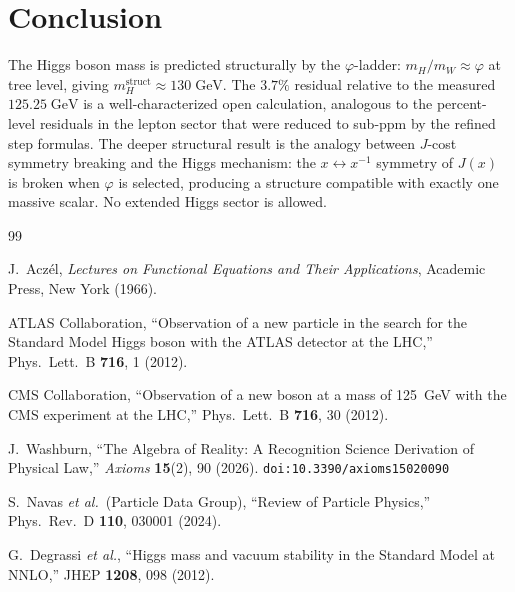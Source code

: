 \documentclass[12pt,a4paper]{article}
\theoremstyle{definition}
\theoremstyle{remark}
\begin{document}
\section{Conclusion}
\label{sec:conclusion}

The Higgs boson mass is predicted structurally by the
$\varphi$-ladder: $m_H / m_W \approx \varphi$ at tree level,
giving $m_H^{\mathrm{struct}} \approx 130\;\mathrm{GeV}$.
The $3.7\%$ residual relative to the measured
$125.25\;\mathrm{GeV}$ is a well-characterized open
calculation, analogous to the percent-level residuals in the
lepton sector that were reduced to sub-ppm by the refined
step formulas.  The deeper structural result is the analogy between
$J$-cost symmetry breaking and the Higgs mechanism: the
$x \leftrightarrow x^{-1}$ symmetry of $J(x)$ is broken
when $\varphi$ is selected, producing a structure compatible with
exactly one massive scalar.  No extended Higgs sector is allowed.

\begin{thebibliography}{99}

J.~Acz\'el, \textit{Lectures on Functional Equations and Their
Applications}, Academic Press, New York (1966).

ATLAS Collaboration, ``Observation of a new particle in the
search for the Standard Model Higgs boson with the ATLAS
detector at the LHC,'' Phys.\ Lett.\ B \textbf{716}, 1 (2012).

CMS Collaboration, ``Observation of a new boson at a mass of
125~GeV with the CMS experiment at the LHC,'' Phys.\ Lett.\ B
\textbf{716}, 30 (2012).

J.~Washburn, ``The Algebra of Reality: A Recognition Science Derivation
of Physical Law,'' \emph{Axioms} \textbf{15}(2), 90 (2026).
\texttt{doi:10.3390/axioms15020090}

S.~Navas \textit{et al.}\ (Particle Data Group),
``Review of Particle Physics,'' Phys.\ Rev.\ D \textbf{110}, 030001
(2024).

G.~Degrassi \textit{et al.}, ``Higgs mass and vacuum stability
in the Standard Model at NNLO,'' JHEP \textbf{1208}, 098 (2012).

\end{thebibliography}
\end{document}
